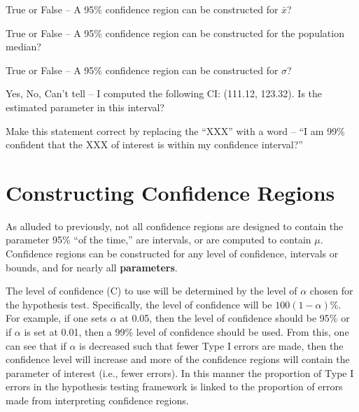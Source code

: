 \documentclass[10pt,openany]{book}\usepackage[]{graphicx}\usepackage[]{color}
\begin{document}
\begin{exsection}
  \item \label{revex:CIstat1TF} True or False -- A 95\% confidence region can be constructed for $\bar{x}$? 
  \item \label{revex:CIparam1TF} True or False -- A 95\% confidence region can be constructed for the population median? 
  \item \label{revex:CIparam2TF} True or False -- A 95\% confidence region can be constructed for $\sigma$? 
  \item \label{revex:CIparam3YNC} Yes, No, Can't tell -- I computed the following CI: (111.12, 123.32). Is the estimated parameter in this interval? 
  \item \label{revex:CIparam4C} Make this statement correct by replacing the ``XXX'' with a word -- ``I am 99\% confident that the XXX of interest is within my confidence interval?'' 
\end{exsection}


\section{Constructing Confidence Regions} \label{sec:CIConstruct}
As alluded to previously, not all confidence regions are designed to contain the parameter 95\% ``of the time,'' are intervals, or are computed to contain $\mu$.  Confidence regions can be constructed for any level of confidence, intervals or bounds, and for nearly all \textbf{parameters}.

The level of confidence (C) to use will be determined by the level of $\alpha$ chosen for the hypothesis test.  Specifically, the level of confidence will be $100(1-\alpha)$\%.  For example, if one sets $\alpha$ at 0.05, then the level of confidence should be 95\% or if $\alpha$ is set at 0.01, then a 99\% level of confidence should be used.  From this, one can see that if $\alpha$ is decreased such that fewer Type I errors are made, then the confidence level will increase and more of the confidence regions will contain the parameter of interest (i.e., fewer errors).  In this manner the proportion of Type I errors in the hypothesis testing framework is linked to the proportion of errors made from interpreting confidence regions.

\end{document}
